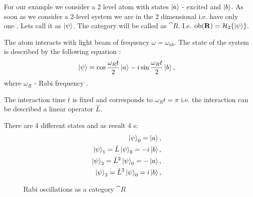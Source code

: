 \begin{example}  
  For our example we consider a 2 level atom with states $\ket{a}$ -
  excited and $\ket{b}$.
  As soon as we consider a 2-level system we are in the 2 dimensional
   i.e. have only one . Lets call
  it as $\ket{\psi}$. The category will be called as
  $\cat{R}$. I.e. $\mathrm{ob}(\mathbf{R}) = \mathcal{H}_2
  \{\ket{\psi}\}$.  

  The atom interacts with light beam of
  frequency $\omega = \omega_{ab}$. The state of the system is
  described by the following equation \cite{bib:quantum_optics_mine}:
  \begin{equation}
    \ket{\psi} = \cos{\frac{\omega_R t}{2}} \ket{a} -
      i \sin{\frac{\omega_R t}{2}} \ket{b},
    \nonumber
  \end{equation}
  where $\omega_R$ - Rabi frequency \cite{bib:quantum_optics_mine}. 

  The interaction time $t$ is fixed and corresponds to $\omega_R t =
  \pi$ i.e. the interaction can be described a linear operator $\hat{L}$.
  
  There are 4 different states and as result 4
  s:
  \begin{eqnarray}
    \ket{\psi}_0 = \ket{a},
    \nonumber \\
    \ket{\psi}_1 = \hat{L} \ket{\psi}_0 = -i \ket{b},
    \nonumber \\
    \ket{\psi}_2 = \hat{L}^2 \ket{\psi}_0 = - \ket{a},
    \nonumber \\
    \ket{\psi}_3 = \hat{L}^3 \ket{\psi}_0 = i \ket{b},
    \nonumber
  \end{eqnarray}

\begin{figure}
  \centering
  \caption{Rabi oscillations as a category $\cat{R}$}
  \label{fig:example_quantum}
\end{figure}
\end{example}
